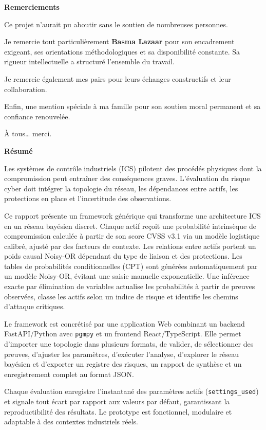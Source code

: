 \documentclass[12pt,a4paper]{article}
\newcommand{\unnumberedsection}[1]{%
  \phantomsection
  {\normalfont\Large\bfseries\sffamily\color{primary}#1\par}
  \vspace{-2pt}{\color{secondary!70}\rule{\linewidth}{0.8pt}}
  \vspace{1.6ex plus 0.2ex}%
}
\begin{document}
\thispagestyle{empty}
\unnumberedsection{Remerciements}

Ce projet n'aurait pu aboutir sans le soutien de nombreuses personnes.

Je remercie tout particulièrement \textbf{Basma Lazaar} pour son encadrement exigeant, ses orientations méthodologiques et sa disponibilité constante. Sa rigueur intellectuelle a structuré l'ensemble du travail.

Je remercie également mes pairs pour leurs échanges constructifs et leur collaboration.

Enfin, une mention spéciale à ma famille pour son soutien moral permanent et sa confiance renouvelée.

\vspace{1cm}
\hfill À tous… merci.

\thispagestyle{empty}
\unnumberedsection{Résumé}

\begin{abstractbox}
Les systèmes de contrôle industriels (ICS) pilotent des procédés physiques dont la compromission peut entraîner des conséquences graves. L'évaluation du risque cyber doit intégrer la topologie du réseau, les dépendances entre actifs, les protections en place et l'incertitude des observations.

Ce rapport présente un framework générique qui transforme une architecture ICS en un réseau bayésien discret. Chaque actif reçoit une probabilité intrinsèque de compromission calculée à partir de son score CVSS v3.1 via un modèle logistique calibré, ajusté par des facteurs de contexte. Les relations entre actifs portent un poids causal Noisy-OR dépendant du type de liaison et des protections. Les tables de probabilités conditionnelles (CPT) sont générées automatiquement par un modèle Noisy-OR, évitant une saisie manuelle exponentielle. Une inférence exacte par élimination de variables actualise les probabilités à partir de preuves observées, classe les actifs selon un indice de risque et identifie les chemins d'attaque critiques.

Le framework est concrétisé par une application Web combinant un backend FastAPI/Python avec \texttt{pgmpy} et un frontend React/TypeScript. Elle permet d'importer une topologie dans plusieurs formats, de valider, de sélectionner des preuves, d'ajuster les paramètres, d'exécuter l'analyse, d'explorer le réseau bayésien et d'exporter un registre des risques, un rapport de synthèse et un enregistrement complet au format JSON.

Chaque évaluation enregistre l'instantané des paramètres actifs (\texttt{settings\_used}) et signale tout écart par rapport aux valeurs par défaut, garantissant la reproductibilité des résultats. Le prototype est fonctionnel, modulaire et adaptable à des contextes industriels réels.
\end{abstractbox}
\end{document}
